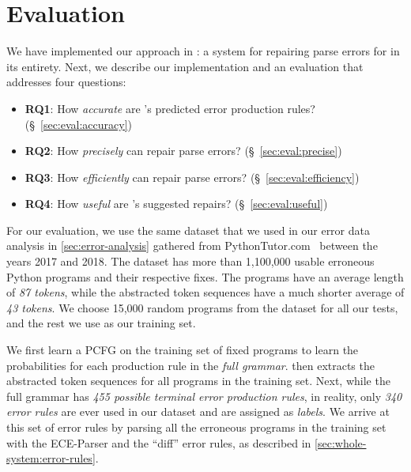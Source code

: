 \section{Evaluation}
\label{sec:eval}

We have implemented our approach in \toolname: a system for repairing parse
errors for \python in its entirety. Next, we describe our implementation and an
evaluation that addresses four questions:

\begin{itemize}
    \item \textbf{RQ1}: How \emph{accurate} are \toolname's predicted error production rules?
                        (\S~\ref{sec:eval:accuracy})
    \item \textbf{RQ2}: How \emph{precisely} can \toolname repair parse errors?
                        (\S~\ref{sec:eval:precise})
    \item \textbf{RQ3}: How \emph{efficiently} can \toolname repair parse errors?
                        (\S~\ref{sec:eval:efficiency})
    \item \textbf{RQ4}: How \emph{useful} are \toolname's suggested repairs?
                        (\S~\ref{sec:eval:useful})
\end{itemize}


For our evaluation, we use the same \python dataset that we used in our error
data analysis in \autoref{sec:error-analysis} gathered from
PythonTutor.com~\citep{Guo2013} between the years 2017 and 2018. The dataset has
more than 1,100,000 usable erroneous Python programs and their respective fixes.
The programs have an average length of \emph{87 tokens}, while the abstracted
token sequences have a much shorter average of \emph{43 tokens}. We choose
15,000 random programs from the dataset for all our tests, and the rest we use
as our training set.

We first learn a PCFG on the training set of fixed programs to learn the
probabilities for each production rule in the \emph{full \python grammar}.
\toolname then extracts the abstracted token sequences for all programs in the
training set. Next, while the full \python grammar has \emph{455 possible
terminal error production rules}, in reality, only \emph{340 error rules} are
ever used in our dataset and are assigned as \emph{labels}. We arrive at this
set of error rules by parsing all the erroneous programs in the training set
with the ECE-Parser and the ``diff'' error rules, as described in
\autoref{sec:whole-system:error-rules}.

